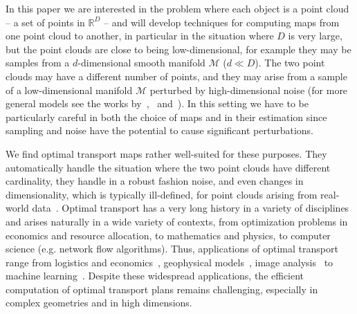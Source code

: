 \documentclass[twoside,11pt]{article}
\begin{document}
In this paper we are interested in the problem where each object is a point
cloud -- a set of points in $\mathbb{R}^D$ -- and will develop techniques for
computing maps from one point cloud to another, in particular in the situation
where $D$ is very large, but the point clouds are close to being
low-dimensional, for example they may be samples from a $d$-dimensional smooth
manifold $\mathcal{M}$ ($d\ll D$). The two point clouds may have a different
number of points, and they may arise from a sample of a low-dimensional
manifold $\mathcal{M}$ perturbed by high-dimensional noise (for more general
models see the works by~\citet{LMR:MGM1},~\citet{MMS:NoisyDictionaryLearning}
and~\citet{LiaoMaggioni}).  In this setting we have to be particularly careful
in both the choice of maps and in their estimation since sampling and noise
have the potential to cause significant perturbations.



We find optimal transport maps rather well-suited for these purposes. They
automatically handle the situation where the two point clouds have different
cardinality, they handle in a robust fashion noise, and even changes in
dimensionality, which is typically ill-defined, for point clouds arising from
real-world data~\citep{LMR:MGM1}. Optimal transport has a very long history in
a variety of disciplines and arises naturally in a wide variety of contexts,
from optimization problems in economics and resource allocation, to mathematics
and physics, to computer science (e.g. network flow algorithms).  Thus,
applications of optimal transport range from logistics and
economics~\citep{beckmann:eco1952,carlier:jcc2008}, geophysical
models~\citep{cullen:book2006}, image
analysis~\citep{rubner:iccv1998,haker:ijcv2004} to machine
learning~\citep{cuturi:arxiv2013,cuturi:jmlr2014}.  Despite these widespread
applications, the efficient computation of optimal transport plans remains
challenging, especially in complex geometries and in high dimensions. 
\end{document}
